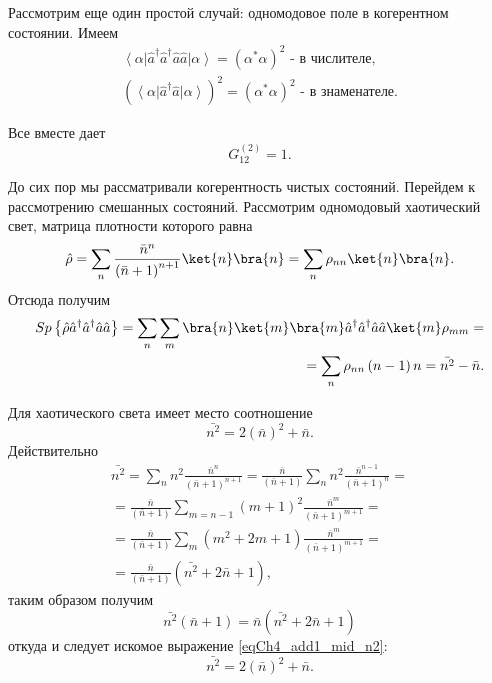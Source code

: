 Рассмотрим еще один простой случай: одномодовое поле в когерентном состоянии. Имеем
\begin{eqnarray}
\left<\alpha\right|\hat{a}^{\dag}\hat{a}^{\dag}\hat{a}\hat{a}\left|\alpha\right>
= \left(\alpha^{*}\alpha\right)^2
\mbox{ - в числителе},
\nonumber \\
\left(\left<\alpha\right|\hat{a}^{\dag}\hat{a}\left|\alpha\right>\right)^2
= \left(\alpha^{*}\alpha\right)^2
\mbox{ - в знаменателе}.
\nonumber
\end{eqnarray}

Все вместе дает
\[
G^{(2)}_{12} = 1.
\]

До сих пор мы рассматривали когерентность чистых состояний. Перейдем к
рассмотрению смешанных состояний. Рассмотрим одномодовый хаотический
свет, матрица плотности  которого равна 
\[
\hat{\rho} = \sum_{n}\frac{\bar{n}^n}{\left(\bar{n} + 1\right)^{n +
    1}} \ket{n}\bra{n} = 
\sum_n\rho_{nn}\ket{n}\bra{n}.
\]
Отсюда получим
\begin{eqnarray}
Sp \left\{\hat{\rho}\hat{a}^{\dag}\hat{a}^{\dag}\hat{a}\hat{a}\right\} = 
\sum_{n}\sum_{m}\bra{n}\ket{m}\bra{m}
\hat{a}^{\dag}\hat{a}^{\dag}\hat{a}\hat{a}
\ket{m} \rho_{mm} = 
\nonumber \\
= \sum_{n}\rho_{nn}\left(n - 1\right)n = \bar{n^2} - \bar{n}.
\label{eqCh4_add1_sp}
\end{eqnarray}

Для хаотического света имеет место соотношение
\begin{equation}
\bar{n^2} = 2
\left(\bar{n}\right)^2 + \bar{n}.
\label{eqCh4_add1_mid_n2}
\end{equation}
Действительно
\begin{eqnarray}
\bar{n^2} = 
\sum_n n^2 \frac{\bar{n}^n}{\left(\bar{n} + 1\right)^{n + 1}} = 
\frac{\bar{n}}{\left(\bar{n} + 1\right)}\sum_n n^2
\frac{\bar{n}^{n-1}}{\left(\bar{n} + 1\right)^{n}} =
\nonumber \\
= 
\frac{\bar{n}}{\left(\bar{n} + 1\right)}\sum_{m = n -1} \left(m +
1\right)^2
\frac{\bar{n}^m}{\left(\bar{n} + 1\right)^{m + 1}} = 
\nonumber \\
= \frac{\bar{n}}{\left(\bar{n} + 1\right)}\sum_m
\left(m^2 + 2 m + 1\right)
\frac{\bar{n}^m}{\left(\bar{n} + 1\right)^{m + 1}} = 
\nonumber \\
=
\frac{\bar{n}}{\left(\bar{n} + 1\right)}\left(\bar{n^2} + 2 \bar{n} +
1\right),
\nonumber
\end{eqnarray}
таким образом получим
\begin{equation}
\bar{n^2}\left(\bar{n} + 1\right) = 
\bar{n}\left(\bar{n^2} + 2 \bar{n} + 1\right)
\nonumber
\end{equation}
откуда и следует искомое выражение \eqref{eqCh4_add1_mid_n2}:
\begin{equation}
\bar{n^2} = 2
\left(\bar{n}\right)^2 + \bar{n}.
\nonumber
\end{equation}

